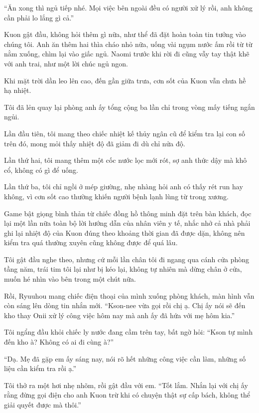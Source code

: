 \documentclass[../main.tex]{subfiles}
\begin{document}
``Ăn xong thì ngủ tiếp nhé. Mọi việc bên ngoài đều có người xử lý rồi, anh không cần phải lo lắng gì cả.''

Kuon gật đầu, không hỏi thêm gì nữa, như thể đã đặt  hoàn toàn tin tưởng vào chúng tôi. Anh ăn thêm hai thìa cháo nhỏ nữa, uống vài ngụm nước ấm rồi từ từ nằm xuống, chìm lại vào giấc ngủ. Naomi trước khi rời đi cũng vẫy tay thật khẽ với anh trai, như một lời chúc ngủ ngon.

\ct

Khi mặt trời dần leo lên cao, đến gần giữa trưa, cơn sốt của Kuon vẫn chưa hề hạ nhiệt.

Tôi đã lẻn quay lại phòng anh ấy tổng cộng ba lần chỉ trong vòng mấy tiếng ngắn ngủi.

Lần đầu tiên, tôi mang theo chiếc nhiệt kế thủy ngân cũ để kiểm tra lại con số trên đó, mong mỏi thấy nhiệt độ đã giảm đi dù chỉ nửa độ.

Lần thứ hai, tôi mang thêm một cốc nước lọc mới rót, sợ anh thức dậy mà khô cổ, không có gì để uống.

Lần thứ ba, tôi chỉ ngồi ở mép giường, nhẹ nhàng hỏi anh có thấy rét run hay không, vì cơn sốt cao thường khiến người bệnh lạnh lùng từ trong xương.

Game bật giọng bình thản từ chiếc đồng hồ thông minh đặt trên bàn khách, đọc lại một lần nữa toàn bộ lời hướng dẫn của nhân viên y tế, nhắc nhở cả nhà phải ghi lại nhiệt độ của Kuon đúng theo khoảng thời gian đã được dặn, không nên kiểm tra quá thường xuyên cũng không được để quá lâu.

Tôi gật đầu nghe theo, nhưng cứ mỗi lần chân tôi đi ngang qua cánh cửa phòng tầng năm, trái tim tôi lại như bị kéo lại, không tự nhiên mà dừng chân ở cửa, muốn hé nhìn vào bên trong một chút nữa.

Rồi, Ryuuhou mang chiếc điện thoại của mình xuống phòng khách, màn hình vẫn còn sáng lên dòng tin nhắn mới. ``Kson-nee vừa gọi rồi chị ạ. Chị ấy nói sẽ đến kho thay Onii xử lý công việc hôm nay mà anh ấy đã hứa với mẹ hôm kia.''

Tôi ngẩng đầu khỏi chiếc ly nước đang cầm trên tay, bất ngờ hỏi: ``Kson tự mình đến kho à? Không có ai đi cùng à?''

``Dạ. Mẹ đã gặp em ấy sáng nay, nói rõ hết những công việc cần làm, những số liệu cần kiểm tra rồi ạ.''

Tôi thở ra một hơi nhẹ nhõm, rồi gật đầu với em. ``Tốt lắm. Nhắn lại với chị ấy rằng đừng gọi điện cho anh Kuon trừ khi có chuyện thật sự cấp bách, không thể giải quyết được mà thôi.''
\end{document}
